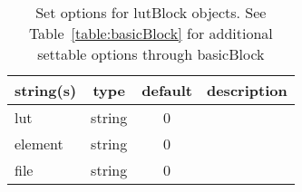 \begin{table}[ht]
\centering
\begin{tabular}{p{5cm} c c p{7cm}}
\hline
string(s) & type & default & description \\
\hline
lut & string & 0 & \\
element & string & 0 & \\
file & string & 0 & \\
\hline
\end{tabular}
\caption{Set options for lutBlock objects. See Table~\ref{table:basicBlock} for additional settable options through basicBlock}
\label{table:lutBlock}
\end{table}

